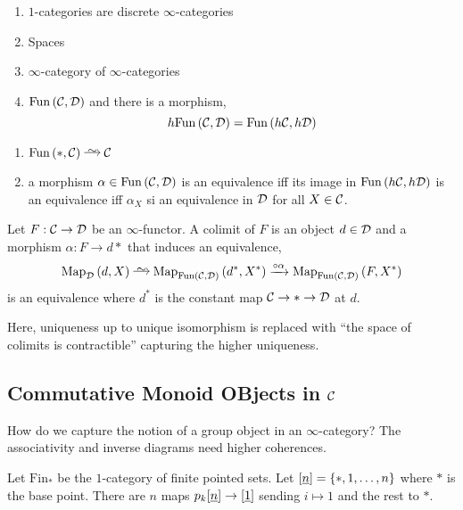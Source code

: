 \documentclass[12pt]{article}
\begin{document}
\begin{example}
\begin{enumerate}
\item $1$-categories are discrete $\infty$-categories
\item Spaces
\item $\infty$-category of $\infty$-categories
\item $\mathrm{Fun}\left( \mathcal{C}, \mathcal{D} \right)$ and there is a morphism,
\[ h \mathrm{Fun}\left( \mathcal{C}, \mathcal{D} \right) = \mathrm{Fun}\left( h \mathcal{C}, h \mathcal{D} \right) \]
\end{enumerate}
\end{example}

\begin{prop}
\begin{enumerate}
\item $\Fun{*}{\C} \iso \C$
\item a morphism $\alpha \in \mathrm{Fun}\left( \mathcal{C}, \mathcal{D} \right)$ is an equivalence iff its image in $\mathrm{Fun}\left( h \mathcal{C}, h \mathcal{D} \right)$ is an equivalence iff $\alpha_X$ si an equivalence in $\mathcal{D}$ for all $X \in \mathcal{C}$. 
\end{enumerate}
\end{prop}

\begin{defn}
Let $F : \mathcal{C} \to \mathcal{D}$ be an $\infty$-functor. A colimit of $F$ is an object $d \in \mathcal{D}$ and a morphism $\alpha : F \to d*$ that induces an equivalence,
\[ \Map{\D}{d}{X} \iso \Map{\Fun{\C}{\D}}{d^*}{X^*} \xrightarrow{ \circ \alpha} \Map{\Fun{\C}{\D}}{F}{X^*} \]
is an equivalence where $d^*$ is the constant map $\mathcal{C} \to * \to \mathcal{D}$ at $d$. 
\end{defn}

\begin{rmk}
Here, uniqueness up to unique isomorphism is replaced with ``the space of colimits is contractible'' capturing the higher uniqueness. 
\end{rmk}

\subsection{Commutative Monoid OBjects in $\mathcal{C}$}

How do we capture the notion of a group object in an $\infty$-category? The associativity and inverse diagrams need higher coherences.

\newcommand{\CMon}[1]{\mathrm{CMon}\left( #1 \right)}
\newcommand{\Fin}{\mathrm{Fin}}
\newcommand{\Space}{\mathbf{Space}}
\newcommand{\Set}{\mathbf{Set}}
\newcommand{\gp}{\mathrm{gp}}

\begin{defn}
Let $\Fin_*$ be the $1$-category of finite pointed sets. Let $[\underline{n}] = \{ *, 1, \dots, n \}$ where $*$ is the base point. There are $n$ maps $p_k [\underline{n}] \to [\underline{1}]$ sending $i \mapsto 1$ and the rest to $*$.
\end{defn}
\end{document}
